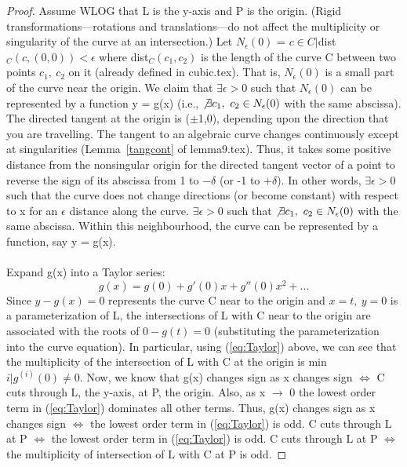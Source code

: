 \begin{proof}\nopagebreak
Assume WLOG that L is the y-axis and P is the origin. (Rigid
transformations---rotations and translations---do not affect the 
multiplicity or singularity of the curve at an intersection.)
Let $N_{\epsilon}(0)$ = {$c\in C |$dist$_{C}(c,(0,0)) < \epsilon$}
where dist$_{C}(c_{1},c_{2})$ is the length of the curve C between
two points $c_{1},\ c_{2}$ on it (already defined in cubic.tex).
That is, $N_{\epsilon}(0)$ is a small part of the curve near the
origin.  We claim that $\exists \epsilon > 0$ such that $N_{\epsilon}(0)$
can be represented by a function y = g(x) (i.e., $\not\exists
c_{1},\ c_{2} \in N_{\epsilon}(0)$ with the same abscissa).
The directed tangent at the origin is ($\pm$1,0), depending upon
the direction that you are travelling.  
The tangent to an algebraic curve
changes continuously except at singularities (Lemma~\ref{tangcont} of
lemma9.tex).
Thus, it takes some positive distance from the nonsingular origin for
the directed tangent vector of a point to reverse the sign of its
abscissa from 1 to $-\delta$ (or -1 to $+\delta$).
In other words, $\exists \epsilon > 0$ such that the curve does not
change directions (or become constant) with respect to x for an
$\epsilon$ distance along the curve.
\hence $\exists \epsilon > 0$ such that $\not\exists c_{1},\ c_{2} \in
N_{\epsilon}(0)$ with the same abscissa.
Within this neighbourhood, 
the curve can be represented by a function,
say y = g(x).\\ \\
Expand g(x) into a Taylor series:
\begin{equation}
\label{eq:Taylor}
g(x) = g(0) + g'(0)x + g''(0)x^2 + \ldots  
\end{equation}
Since $y-g(x) = 0$ represents the curve C near to the origin
and $x=t,\ y=0$ is a parameterization of L, the intersections of L
with C near to the origin are associated with the roots of $0-g(t)=0$
(substituting the parameterization into the curve equation).
In particular, using (\ref{eq:Taylor}) above, we can see that the
multiplicity of the intersection of L with C at the origin is
min ${i|g^{(i)}(0) \neq 0}$.
Now, we know that g(x) changes sign as x changes sign $\Leftrightarrow$
C cuts through L, the y-axis, at P, the origin.
Also, as x $\rightarrow$ 0 the lowest order term in (\ref{eq:Taylor})
dominates all other terms.
Thus, g(x) changes sign as x changes sign $\Leftrightarrow$ the lowest
order term in (\ref{eq:Taylor}) is odd.
\hence C cuts through L at P $\Leftrightarrow$ the lowest order term
in (\ref{eq:Taylor}) is odd.
\hence C cuts through L at P $\Leftrightarrow$ the multiplicity
of intersection of L with C at P is odd.
\end{proof}
